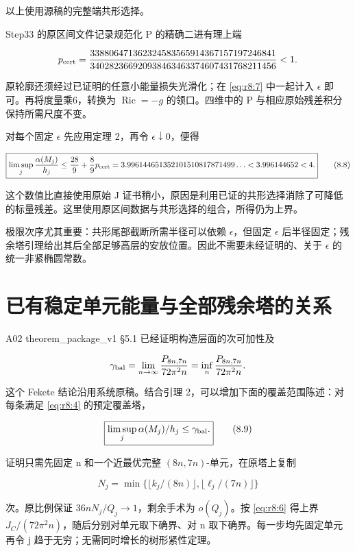 \documentclass[UTF8,11pt,fontset=none]{ctexart}
\begin{document}
以上使用源稿的完整端共形选择。

Step33 的原区间文件记录规范化 P 的精确二进有理上端

\[
p_{\rm cert}=
\frac{338806471362324583565914367157197246841}
{340282366920938463463374607431768211456}
<1.
\]

原轮廓还须经过已证明的任意小能量损失光滑化；在 \eqref{eq:r8:7} 中一起计入 \(\epsilon\) 即可。再将度量乘6，转换为 \(\operatorname{Ric}=-g\) 的领口。四维中的 P 与相应原始残差积分保持所需尺度不变。

对每个固定 \(\epsilon\) 先应用定理 2，再令 \(\epsilon\downarrow0\)，便得

\[
\boxed{
\limsup_j\frac{\alpha(M_j)}{h_j}
\le\frac{28}{9}+\frac89p_{\rm cert}
=3.996144651352101510817871499\ldots
<3.996144652<4.
}
\tag{8.8}\label{eq:r8:8}
\]

这个数值比直接使用原始 J 证书稍小，原因是利用已证的共形选择消除了可降低的标量残差。这里使用原区间数据与共形选择的组合，所得仍为上界。

极限次序尤其重要：共形尾部截断所需半径可以依赖 \(\epsilon\)，但固定 \(\epsilon\) 后半径固定；残余塔引理给出其后全部足够高层的安放位置。因此不需要未经证明的、关于 \(\epsilon\) 的统一非紧椭圆常数。

\section{已有稳定单元能量与全部残余塔的关系}\label{ch8:ux5df2ux6709ux7a33ux5b9aux5355ux5143ux80fdux91cfux4e0eux5168ux90e8ux6b8bux4f59ux5854ux7684ux5173ux7cfb}

A02 theorem\_package\_v1 §5.1 已经证明构造层面的次可加性及

\[
\gamma_{\rm bal}
=\lim_{n\to\infty}\frac{\mathfrak P_{8n,7n}}{72\pi^2n}
=\inf_n\frac{\mathfrak P_{8n,7n}}{72\pi^2n}.
\]

这个 Fekete 结论沿用系统原稿。结合引理 2，可以增加下面的覆盖范围陈述：对每条满足 \eqref{eq:r8:4} 的预定覆盖塔，

\[
\boxed{\limsup_j\alpha(M_j)/h_j\le\gamma_{\rm bal}.}
\tag{8.9}\label{eq:r8:9}
\]

证明只需先固定 n 和一个近最优完整 \((8n,7n)\)-单元，在原塔上复制

\[
N_j=\min\{\lfloor k_j/(8n)\rfloor,\lfloor\ell_j/(7n)\rfloor\}
\]

次。原比例保证 \(36nN_j/Q_j\to1\)，剩余手术为 \(o(Q_j)\)。按 \eqref{eq:r8:6} 得上界 \(J_C/(72\pi^2n)\)，随后分别对单元取下确界、对 n 取下确界。每一步均先固定单元再令 j 趋于无穷；无需同时增长的树形紧性定理。
\end{document}
